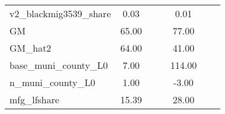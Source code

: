 \begin{table}[htbp]
\begin{tabular}{l*{2}{ccc}}
v2\_blackmig3539\_share&        0.03&            &            &        0.01&            &            \\
GM                  &       65.00&            &            &       77.00&            &            \\
GM\_hat2             &       64.00&            &            &       41.00&            &            \\
base\_muni\_county\_L0 &        7.00&            &            &      114.00&            &            \\
n\_muni\_county\_L0    &        1.00&            &            &       -3.00&            &            \\
mfg\_lfshare         &       15.39&            &            &       28.00&            &            \\
\bottomrule
\end{tabular}
\end{table}
